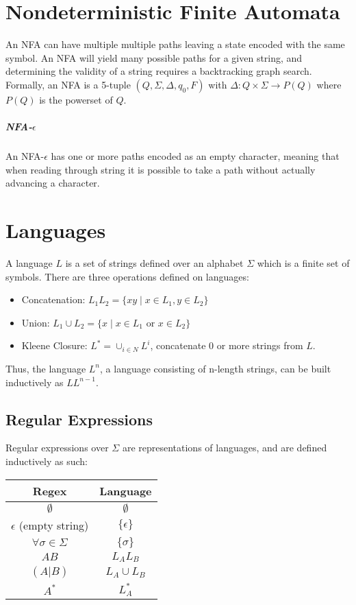 \documentclass[11pt]{article}
\begin{document}
\section{Nondeterministic Finite Automata}
	An NFA can have multiple multiple paths leaving a state encoded with the same symbol. An NFA will yield many possible paths for a given string, and determining the validity of a string requires a backtracking graph search. Formally, an NFA is a 5-tuple $(Q, \Sigma, \Delta, q_0, F)$ with $\Delta : Q \times \Sigma \rightarrow P(Q)$ where $P(Q)$ is the powerset of $Q$.
	
	\subparagraph{NFA-$\epsilon$} An NFA-$\epsilon$ has one or more paths encoded as an empty character, meaning that when reading through string it is possible to take a path without actually advancing a character.
	
\section{Languages}
	A language $L$ is a set of strings defined over an alphabet $\Sigma$ which is a finite set of symbols. There are three operations defined on languages:
	\begin{itemize}
		\item Concatenation: $L_1L_2 = \{xy \mid x \in L_1,  y \in L_2\}$
		\item Union: $L_1 \cup  L_2 = \{x \mid x \in L_1 \text{ or } x \in L_2\}$
		\item Kleene Closure: $L^* = \cup_{i\in N} L^i$, concatenate 0 or more strings from $L$.
	\end{itemize}
	Thus, the language $L^n$, a language consisting of n-length strings, can be built inductively as $LL^{n-1}$.
	
	\subsection{Regular Expressions}
		Regular expressions over $\Sigma$ are representations of languages, and are defined inductively as such:
		\begin{center}
		\begin{tabular}{c|c}
			Regex & Language\\\hline
			$\emptyset$ & $\emptyset$\\
			$\epsilon$ (empty string) & $\{\epsilon\}$\\
			$\forall \sigma \in \Sigma$ & $\{\sigma\}$\\
			$AB$ & $L_AL_B$\\
			$(A|B)$ & $L_A \cup L_B$\\
			$A^*$ & $L_A^*$
		\end{tabular}
		\end{center}
		
\end{document}
